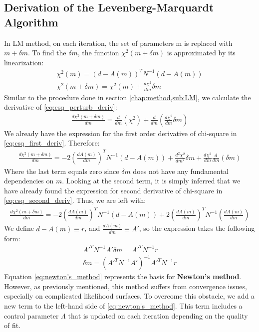 \documentclass[12pt, TexShade, letterpaper]{report}
\begin{document}
\subsection{Derivation of the Levenberg-Marquardt Algorithm}
In LM method, on each iteration, the set of parameters m is replaced with $m+\delta m$. To find the $\delta m$, the function $\chi^2 (m +\delta m)$ is approximated by its linearization: 
\begin{gather}
    \chi^2 (m) = (d-A(m))^T N^{-1} (d-A(m))\\
    \chi^2 (m + \delta m) =  \chi^2 (m) + \frac{d \chi^2}{dm} \delta m \label{eq:csq_perturb_deriv}
\end{gather}
Similar to the procedure done in section \ref{chap:method,sub:LM}, we calculate the derivative of \ref{eq:csq_perturb_deriv}:
\begin{gather}
    \frac{d \chi^2 (m +\delta m)}{dm} = \frac{d}{dm} (\chi^2) + \frac{d}{dm} (\frac{d\chi^2}{dm} \delta m)
\end{gather}
We already have the expression for the first order derivative of chi-square in \ref{eq:csq_first_deriv}. Therefore:
\begin{gather}
   \frac{d \chi^2 (m +\delta m)}{dm} =  -2 (\frac{dA(m)}{dm})^T N^{-1} (d-A(m)) + \frac{d^2 \chi^2}{dm^2} \delta m + \frac{d\chi^2}{dm} \frac{d}{dm} (\delta m)
\end{gather}
Where the last term equals zero since $\delta m$ does not have any fundamental dependencies on $m$. Looking at the second term, it is simply inferred that we have already found the expression for second derivative of chi-square in \ref{eq:csq_second_deriv}. Thus, we are left with:
\begin{gather}
    \frac{d \chi^2 (m +\delta m)}{dm} =  -2 (\frac{dA(m)}{dm})^T N^{-1} (d-A(m)) + 2 (\frac{dA(m)}{dm})^T N^{-1} (\frac{dA(m)}{dm})
\end{gather}
We define  $d-A(m) \equiv r$, and $\frac{dA(m)}{dm} \equiv A'$, so the expression takes the following form:
\begin{gather}
    A'^{T} N^{-1}A' \delta m = A'^T N^{-1} r \\
    \delta m = (A'^{T} N^{-1}A')^{-1} A'^T N^{-1} r \label{eq:newton's_method}   
\end{gather}
Equation \ref{eq:newton's_method} represents the basis for \textbf{Newton's method}. However, as previously mentioned, this method suffers from convergence issues, especially on complicated likelihood surfaces. To overcome this obstacle, we add a new term to the left-hand side of \ref{eq:newton's_method}. This term includes a control parameter $\Lambda$ that is updated on each iteration depending on the quality of fit. \par
\end{document}
